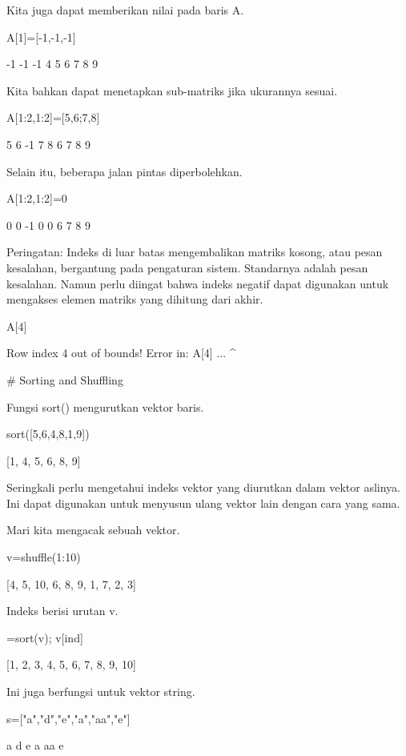 \documentclass{article}
\begin{document}
Kita juga dapat memberikan nilai pada baris A.


\>A[1]=[-1,-1,-1]


               -1            -1            -1 
                4             5             6 
                7             8             9 

Kita bahkan dapat menetapkan sub-matriks jika ukurannya sesuai.


\>A[1:2,1:2]=[5,6;7,8]


                5             6            -1 
                7             8             6 
                7             8             9 

Selain itu, beberapa jalan pintas diperbolehkan.


\>A[1:2,1:2]=0


                0             0            -1 
                0             0             6 
                7             8             9 

Peringatan: Indeks di luar batas mengembalikan matriks kosong, atau
pesan kesalahan, bergantung pada pengaturan sistem. Standarnya adalah
pesan kesalahan. Namun perlu diingat bahwa indeks negatif dapat
digunakan untuk mengakses elemen matriks yang dihitung dari akhir.


\>A[4]


    Row index 4 out of bounds!
    Error in:
    A[4] ...
        ^

# Sorting and Shuffling

Fungsi sort() mengurutkan vektor baris.


\>sort([5,6,4,8,1,9])


    [1,  4,  5,  6,  8,  9]

Seringkali perlu mengetahui indeks vektor yang diurutkan dalam vektor
aslinya. Ini dapat digunakan untuk menyusun ulang vektor lain dengan
cara yang sama.


Mari kita mengacak sebuah vektor.


\>v=shuffle(1:10)


    [4,  5,  10,  6,  8,  9,  1,  7,  2,  3]

Indeks berisi urutan v.


=sort(v); v[ind]


    [1,  2,  3,  4,  5,  6,  7,  8,  9,  10]

Ini juga berfungsi untuk vektor string.


\>s=["a","d","e","a","aa","e"]


    a
    d
    e
    a
    aa
    e
\end{document}
